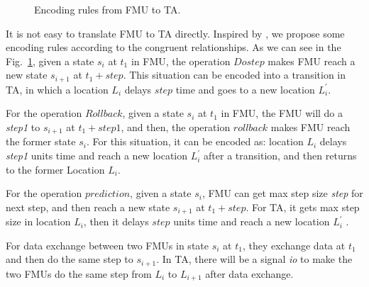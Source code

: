 \begin{figure}[htbp]
	\caption{Encoding rules from FMU to TA.}
	\label{fmutota}
\end{figure}

It is not easy to translate FMU to TA directly. Inspired by \cite{Tripakis15}, we propose some encoding rules according to the congruent relationships. As we can see in the Fig.~\ref{fmutota}, given a state $s_{i}$ at $t_{1}$ in FMU, the operation $Dostep$ makes FMU reach a new state $s_{i+1}$ at $t_{1}+step$. This situation can be encoded into a transition in TA, in which a location $L_{i}$ delays $step$ time and goes to a new location $L_{i}^{\prime}$.

For the operation $Rollback$, given a state $s_{i}$ at $t_{1}$ in FMU, the FMU will do a \emph{step1} to $s_{i+1}$ at $t_{1}+step1$, and then, the operation $rollback$ makes FMU reach the former state $s_{i}$. For this situation, it can be encoded as: location $L_{i}$ delays \emph{step1} units time and reach a new location $L_{i}^{\prime}$ after a transition, and then returns to the former Location $L_{i}$. 

For the operation $prediction$, given a state $s_{i}$, FMU can get max step size \emph{step} for next step, and then reach a new state $s_{i+1}$ at $t_{1}+step$. For TA, it gets max step size in location $L_{i}$, then it delays $step$ units time and reach a new location $L_{i}^{\prime}$ .

For data exchange between two FMUs in state $s_{i}$ at $t_{1}$, they exchange data at $t_{1}$ and then do the same step to $s_{i+1}$. In TA, there will be a signal \emph{io} to make the two FMUs do the same step from $L_{i}$ to $L_{i+1}$ after data exchange.


